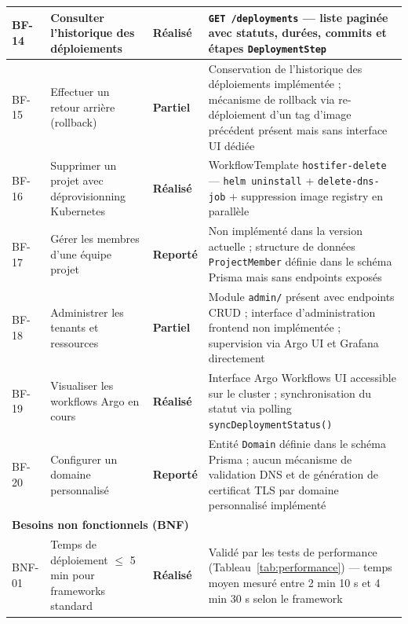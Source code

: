 \begin{longtable}{|p{0.8cm}|p{5.5cm}|p{2.2cm}|p{4.5cm}|}
BF-14
  & Consulter l'historique des déploiements
  & \textcolor{green!60!black}{\textbf{Réalisé}}
  & \texttt{GET /deployments} — liste paginée avec statuts, durées, commits et étapes \texttt{DeploymentStep} \\
\hline

BF-15
  & Effectuer un retour arrière (rollback)
  & \textcolor{orange!80!black}{\textbf{Partiel}}
  & Conservation de l'historique des déploiements implémentée ; mécanisme de rollback via re-déploiement d'un tag d'image précédent présent mais sans interface UI dédiée \\
\hline

BF-16
  & Supprimer un projet avec déprovisionning Kubernetes
  & \textcolor{green!60!black}{\textbf{Réalisé}}
  & WorkflowTemplate \texttt{hostifer-delete} — \texttt{helm uninstall} + \texttt{delete-dns-job} + suppression image registry en parallèle \\
\hline

BF-17
  & Gérer les membres d'une équipe projet
  & \textcolor{red!70!black}{\textbf{Reporté}}
  & Non implémenté dans la version actuelle ; structure de données \texttt{ProjectMember} définie dans le schéma Prisma mais sans endpoints exposés \\
\hline

BF-18
  & Administrer les tenants et ressources
  & \textcolor{orange!80!black}{\textbf{Partiel}}
  & Module \texttt{admin/} présent avec endpoints CRUD ; interface d'administration frontend non implémentée ; supervision via Argo UI et Grafana directement \\
\hline

BF-19
  & Visualiser les workflows Argo en cours
  & \textcolor{green!60!black}{\textbf{Réalisé}}
  & Interface Argo Workflows UI accessible sur le cluster ; synchronisation du statut via polling \texttt{syncDeploymentStatus()} \\
\hline

BF-20
  & Configurer un domaine personnalisé
  & \textcolor{red!70!black}{\textbf{Reporté}}
  & Entité \texttt{Domain} définie dans le schéma Prisma ; aucun mécanisme de validation DNS et de génération de certificat TLS par domaine personnalisé implémenté \\
\hline

\multicolumn{4}{|l|}{\textbf{Besoins non fonctionnels (BNF)}} \\
\hline

BNF-01
  & Temps de déploiement $\leq$ 5 min pour frameworks standard
  & \textcolor{green!60!black}{\textbf{Réalisé}}
  & Validé par les tests de performance (Tableau~\ref{tab:performance}) — temps moyen mesuré entre 2 min 10 s et 4 min 30 s selon le framework \\
\hline


\end{longtable}
